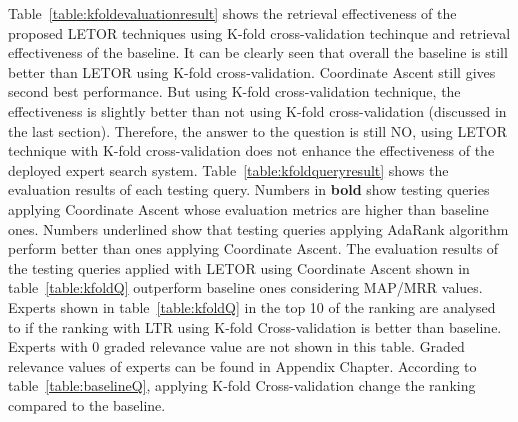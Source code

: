 Table~\ref{table:kfoldevaluationresult} shows the retrieval effectiveness of the proposed LETOR techniques using K-fold cross-validation techinque
and retrieval effectiveness of the baseline.
It can be clearly seen that overall the baseline is still better than LETOR using K-fold cross-validation. 
Coordinate Ascent still gives second best performance. But using K-fold cross-validation technique, the effectiveness is slightly better than
not using K-fold cross-validation (discussed in the last section). Therefore, the answer
to the question is still NO, using LETOR technique with K-fold cross-validation does not enhance the effectiveness of the deployed expert search system.
Table~\ref{table:kfoldqueryresult} shows the evaluation results of each testing query. Numbers in \textbf{bold} show testing queries applying Coordinate Ascent 
whose evaluation metrics are higher
than baseline ones. Numbers underlined show that testing queries applying AdaRank algorithm perform better than ones applying Coordinate Ascent.
The evaluation results of the testing queries applied with LETOR using Coordinate Ascent shown in table~\ref{table:kfoldQ} outperform 
baseline ones considering MAP/MRR values. Experts shown in table~\ref{table:kfoldQ} in the top 10 of the ranking are analysed to if the ranking
with LTR using K-fold Cross-validation is better than baseline. Experts with 0 graded relevance value are not shown in this table. 
Graded relevance values of experts can be found in Appendix Chapter. According to table~\ref{table:baselineQ}, applying K-fold Cross-validation change the ranking compared to the baseline.
